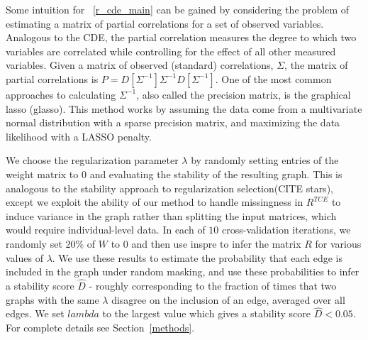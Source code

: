 \documentclass{article}
\begin{document}
Some intuition for ~\ref{r_cde_main} can be gained by considering the problem
of estimating a matrix of partial correlations for a set of observed variables.
Analogous to the CDE, the partial correlation measures the degree to which two
variables are correlated while controlling for the effect of all other measured
variables. Given a matrix of observed (standard) correlations, $\Sigma$, the matrix of
partial correlations is $P = D[\Sigma^{-1}] \Sigma^{-1} D[\Sigma^{-1}]$. One of
the most common approaches to calculating $\Sigma^{-1}$, also called
the precision matrix, is the graphical lasso (glasso). This method works
by assuming the data come from a multivariate normal distribution with a sparse
precision matrix, and maximizing the data likelihood with a LASSO penalty.

 We choose the
regularization parameter $\lambda$ by randomly setting entries of the weight matrix to 0 and
evaluating the stability of the resulting graph. This is analogous to the
stability approach to regularization selection(CITE stars), except we exploit the
ability of our method to handle missingness in $R^{TCE}$ to induce variance in the graph rather
than splitting the input matrices, which would require individual-level data.
In each of $10$ cross-validation iterations, we randomly set $20\%$ of $W$ to $0$
and then use inspre to infer the matrix $R$ for various values of $\lambda$.
We use these results to estimate the probability
that each edge is included in the graph under random masking, and use these probabilities
to infer a stability score $\hat{D}$ - roughly corresponding to the fraction of times
that two graphs with the same $\lambda$ disagree on the inclusion of an edge,
 averaged over all edges.
We set $lambda$ to the largest value which gives a stability score $\hat{D} < 0.05$.
For complete details see Section~\ref{methods}.
\end{document}
